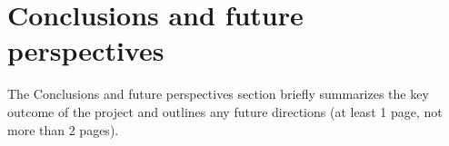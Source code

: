\graphicspath{{chapters/07_conclusions/}}
\chapter{Conclusions and future perspectives}

The Conclusions and future perspectives section briefly summarizes the key outcome of
the project and outlines any future directions (at least 1 page, not more than 2 pages).